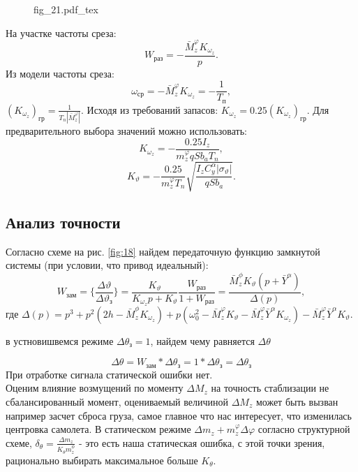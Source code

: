 \documentclass{article}
\begin{document}
\begin{figure}[H]
\centering
{fig_21.pdf_tex}
\end{figure}

На участке частоты среза:
\[
W_{раз} = -\frac{\bar{M}_z^\varphi K_{\omega_z}}{p}.
\]
Из модели частоты среза:
\[
\omega_{ср} = -\bar{M}_z^\varphi K_{\omega_z} = -\frac{1}{T_п},
\]
$(K_{\omega_z})_{гр} = \frac{1}{T_n |\bar{M}_z^\varphi|}.$
Исходя из требований запасов:
$K_{\omega_z} = 0.25 (K_{\omega_z})_{гр}.$
Для предварительного выбора значений можно использовать:
\[
K_{\omega_z} = - \frac{0.25 I_z}{{m}_z^\varphi q S b_a T_n},
\]
\[
K_{\vartheta} = - \frac{0.25}{{m}_z^\varphi T_n} \sqrt{\frac{I_z C_y^\alpha |\sigma_\vartheta|}{q S b_a}}.
\]

\subsection{Анализ точности}
Согласно схеме на рис. \ref{fig:18} найдем передаточную функцию замкнутой системы (при условии, что привод идеальный):
\begin{equation}
W_{зам}= \{\frac{\Delta \vartheta}{\Delta \vartheta_{з}}\} =\frac{K_{\vartheta}}{K_{\omega_z}p +K_{\vartheta}}\frac{W_{раз}}{1 + W_{раз}} =\frac{\bar{M}_z^\phi K_{\vartheta}(p + \bar{Y}^\alpha)}{\Delta(p)},  
\label{eq:w_zam_1}
\end{equation}
где $\Delta(p) = p^3 + p^2(2h - \bar{M}_z^\phi K_{\omega_z}) + p(\omega_0^2 -\bar{M}_z^\varphi K_\vartheta - \bar{M}_z^\varphi \bar{Y}^\alpha K_{\omega_z}) -\bar{M}_z^\varphi \bar{Y}^\alpha K_{\vartheta} $.


в устновишвемся режиме $\Delta \theta_з = 1$, найдем чему равняется $\Delta \theta$

\[
\Delta \theta = W_{зам} * \Delta \theta_з = 1* \Delta \theta_з = \Delta \theta_з
\]
При отработке сигнала статической ошибки нет. \\
Оценим влияние возмущений по моменту $\Delta M_z$ на точность стаблизации не сбалансированный момент, оцениваемый величиной $\Delta M_z$ может быть вызван например засчет сброса груза, самое главное что нас интересует, что изменилась центровка самолета. В статическом режиме $\Delta m_z + m_z^\varphi \Delta \varphi$ согласно структурной схеме, $\delta_\theta =\frac{\Delta m_z}{K_\theta m_z^\phi}$ - это есть наша статическая ошибка, с этой точки зрения, рационально выбирать максимальное больше $K_\theta$.
\end{document}
